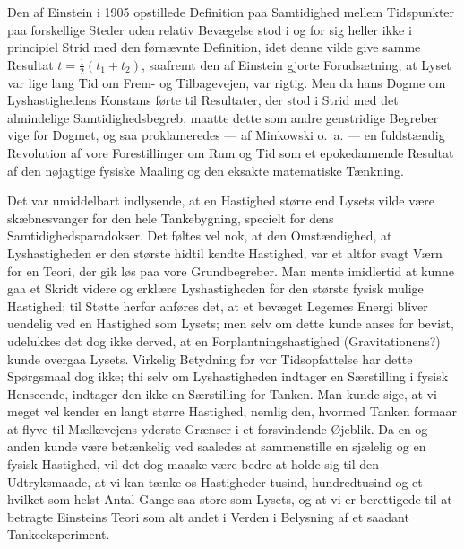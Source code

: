 \documentclass[12pt,a4paper]{article}
\newcommand{\opage}[1]{\marginnote{\footnotesize\textit{[#1]}}}
\begin{document}
Den af Einstein i 1905 opstillede Definition paa Samtidighed mellem Tidspunkter
paa forskellige Steder uden relativ Bevægelse stod i og for sig heller ikke i
principiel Strid med den førnævnte Definition, idet denne vilde give samme
Resultat $t = \tfrac{1}{2}(t_{1} + t_{2})$, saafremt den af Einstein gjorte
Forudsætning, at Lyset var lige lang Tid om Frem- og Tilbagevejen, var rigtig.
Men da hans Dogme om Lyshastighedens Konstans førte til Resultater, der stod i
Strid med det almindelige Samtidighedsbegreb, maatte dette som andre
genstridige Begreber vige for Dogmet, og saa proklameredes --- af Minkowski
o.~a. --- \guillemotright en fuldstændig Revolution af vore Forestillinger om
Rum og Tid\guillemotleft{} som et epokedannende Resultat af den nøjagtige
fysiske Maaling og den eksakte matematiske Tænkning.

Det var umiddelbart indlysende, at en Hastighed større end Lysets vilde være
skæbnesvanger for den hele Tankebygning, specielt for dens
Samtidighedsparadokser. Det føltes vel nok, at den Omstændighed, at
Lyshastigheden er den største hidtil kendte Hastighed, var et altfor svagt Værn
for en Teori, der gik løs paa vore Grundbegreber. Man mente imidlertid at kunne
gaa et Skridt videre og erklære Lyshastigheden for den største fysisk mulige
Hastighed; til Støtte herfor anføres det, at et bevæget Legemes Energi bliver
uendelig ved en Hastighed som Lysets; men selv om dette kunde anses for bevist,
udelukkes det dog ikke derved, at en Forplantningshastighed (Gravitationens?)
kunde overgaa Lysets. Virkelig Betydning for vor Tidsopfattelse har dette
Spørgsmaal dog ikke; thi selv om Lyshastigheden indtager en Særstilling i
fysisk Henseende, indtager den ikke en Særstilling for Tanken. Man kunde sige,
at vi meget vel kender en langt større Hastighed, nemlig den, hvormed
\opage{5} Tanken formaar at flyve til Mælkevejens yderste Grænser i et forsvindende
Øjeblik. Da en og anden kunde være betænkelig ved saaledes at sammenstille en
sjælelig og en fysisk Hastighed, vil det dog maaske være bedre at holde sig til
den Udtryksmaade, at vi kan tænke os Hastigheder tusind, hundredtusind og et
hvilket som helst Antal Gange saa store som Lysets, og at vi er berettigede til
at betragte Einsteins Teori som alt andet i Verden i Belysning af et saadant
Tankeeksperiment.
\end{document}
